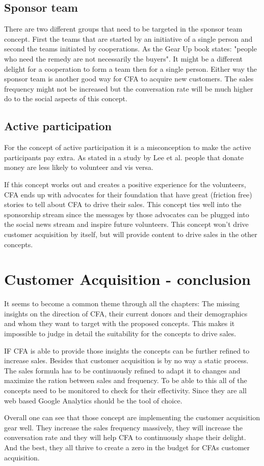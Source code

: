 \subsection{Sponsor team}
There are two different groups that need to be targeted in the sponsor team concept. First the teams that are started by an initiative of a single person and second the teams initiated by cooperations. As the Gear Up book states: "people who need the remedy are not necessarily the buyers"\cite{Ramfelt}. It might be a different delight for a cooperation to form a team then for a single person. Either way the sponsor team is another good way for CFA to acquire new customers. The sales frequency might not be increased but the conversation rate will be much higher do to the social aspects of this concept.

\subsection{Active participation}

For the concept of active participation it is a misconception to make the active participants pay extra. As stated in a study by Lee et al. people that donate money are less likely to volunteer and vis versa\cite{Lee2007}. 

If this concept works out and creates a positive experience for the volunteers, CFA ends up with advocates for their foundation that have great (friction free) stories to tell about CFA to drive their sales. This concept ties well into the sponsorship stream since the messages by those advocates can be plugged into the social news stream and inspire future volunteers. This concept won't drive customer acquisition by itself, but will provide content to drive sales in the other concepts.


\section{Customer Acquisition - conclusion}

It seems to become a common theme through all the chapters: The missing insights on the direction of CFA, their current donors and their demographics and whom they want to target with the proposed concepts. This makes it impossible to judge in detail the suitability for the concepts to drive sales. 

IF CFA is able to provide those insights the concepts can be further refined to increase sales. Besides that customer acquisition is by no way a static process. The sales formula has to be continuously refined to adapt it to changes and maximize the ration between sales and frequency. To be able to this all of the concepts need to be monitored to check for their effectivity. Since they are all web based Google Analytics should be the tool of choice.

Overall one can see that those concept are implementing the customer acquisition gear well. They increase the sales frequency massively, they will increase the conversation rate and they will help CFA to continuously shape their delight. And the best, they all thrive to create a zero in the budget for CFAs customer acquisition.